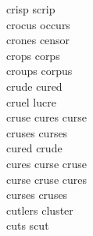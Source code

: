 crisp scrip\\
crocus occurs\\
crones censor\\
crops corps\\
croups corpus\\
crude cured\\
cruel lucre\\
cruse cures curse\\
cruses curses\\
cured crude\\
cures curse cruse\\
curse cruse cures\\
curses cruses\\
cutlers cluster\\
cuts scut\\


